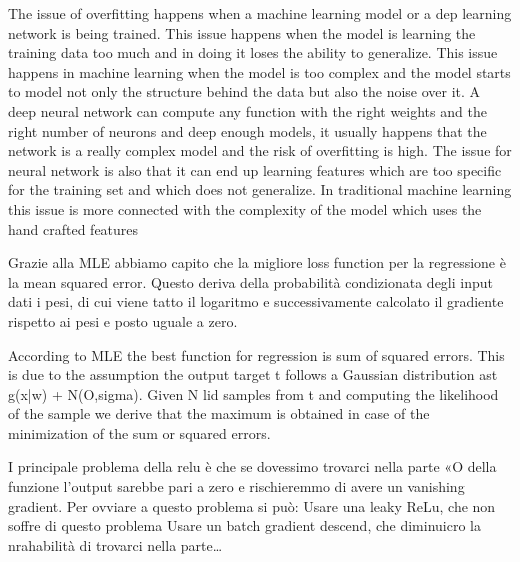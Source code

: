 \begin{box-stud}
    The issue of overfitting happens when a machine learning model or a dep learning network is being trained. This issue happens when the model is learning the training data too much and in doing it loses the ability to generalize. This issue happens in machine learning when the model is too complex and the model starts to model not only the structure behind the data but also the noise over it. A deep neural network can compute any function with the right weights and the right number of neurons and deep enough models, it usually happens that the network is a really complex model and the risk of overfitting is high. The issue for neural network is also that it can end up learning features which are too specific for the training set and which does not generalize. In traditional machine learning this issue is more connected with the complexity of the model which uses the hand crafted features
\end{box-stud}



\begin{box-stud}
    Grazie alla MLE abbiamo capito che la migliore loss function per la regressione è la mean squared error. Questo deriva della probabilità condizionata degli input dati i pesi, di cui viene tatto il logaritmo e successivamente calcolato il gradiente rispetto ai pesi e posto uguale a zero.
\end{box-stud}

\begin{box-sol}
    According to MLE the best function for regression is sum of squared errors. This is due to the assumption the output target t follows a Gaussian distribution ast ~ g(x|w) + N(O,sigma). Given N lid samples from t and computing the likelihood of the sample we derive that the maximum is obtained in case of the minimization of the sum or squared errors.
\end{box-sol}



\begin{box-stud}
    I principale problema della relu è che se dovessimo trovarci nella parte «O della funzione l'output sarebbe pari a zero e rischieremmo di avere un vanishing gradient. Per ovviare a questo problema si può: Usare una leaky ReLu, che non soffre di questo problema Usare un batch gradient descend, che diminuicro la nrahabilità di trovarci nella parte…
\end{box-stud}

